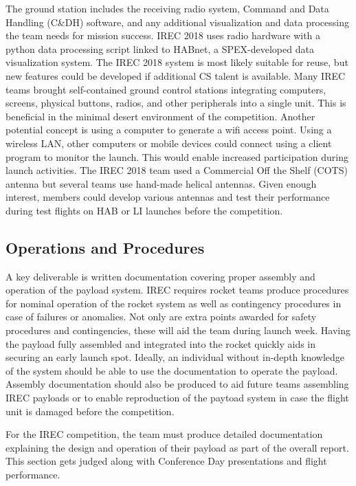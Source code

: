 \documentclass[conference]{IEEEtran} %
\begin{document}
The ground station includes the receiving radio system, Command and Data Handling (C\&DH) software, and any additional visualization and data processing the team needs for mission success. IREC 2018 uses radio hardware with a python data processing script linked to HABnet, a SPEX-developed data visualization system. The IREC 2018 system is most likely suitable for reuse, but new features could be developed if additional CS talent is available. Many IREC teams brought self-contained ground control stations integrating computers, screens, physical buttons, radios, and other peripherals into a single unit. This is beneficial in the minimal desert environment of the competition. Another potential concept is using a computer to generate a wifi access point. Using a wireless LAN, other computers or mobile devices could connect using a client program to monitor the launch. This would enable increased participation during launch activities. The IREC 2018 team used a Commercial Off the Shelf (COTS) antenna but several teams use hand-made helical antennas. Given enough interest, members could develop various antennas and test their performance during test flights on HAB or LI launches before the competition. 

\subsection{Operations and Procedures}
\label{subsec:opsproc}

A key deliverable is written documentation covering proper assembly and operation of the payload system. IREC requires rocket teams produce procedures for nominal operation of the rocket system as well as contingency procedures in case of failures or anomalies. Not only are extra points awarded for safety procedures and contingencies, these will aid the team during launch week. Having the payload fully assembled and integrated into the rocket quickly aids in securing an early launch spot. Ideally, an individual without in-depth knowledge of the system should be able to use the documentation to operate the payload. Assembly documentation should also be produced to aid future teams assembling IREC payloads or to enable reproduction of the paytoad system in case the flight unit is damaged before the competition.

For the IREC competition, the team must produce detailed documentation explaining the design and operation of their payload as part of the overall report. This section gets judged along with Conference Day presentations and flight performance.
\end{document}
